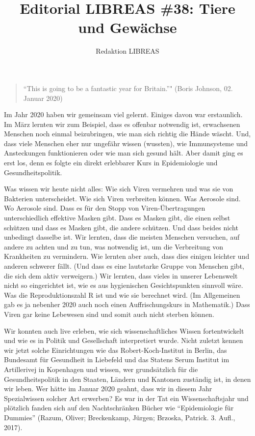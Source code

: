 \documentclass[a4paper,
fontsize=11pt,
oneside,
numbers=noperiodatend,
parskip=half-,
bibliography=totoc,
final
]{scrartcl}
\title{\LARGE{Editorial LIBREAS \#38: Tiere und Gewächse}}%
\author{Redaktion LIBREAS} %
\date{}
\begin{document}
\maketitle
\thispagestyle{fancyplain} 


\begin{quote}
\enquote{This is going to be a fantastic year for Britain.}" (Boris
Johnson, 02. Januar 2020)
\end{quote}

Im Jahr 2020 haben wir gemeinsam viel gelernt. Einiges davon war
erstaunlich. Im März lernten wir zum Beispiel, dass es offenbar
notwendig ist, erwachsenen Menschen noch einmal beizubringen, wie man
sich richtig die Hände wäscht. Und, dass viele Menschen eher nur
ungefähr wissen (wussten), wie Immunsysteme und Ansteckungen
funktionieren oder wie man sich gesund hält. Aber damit ging es erst
los, denn es folgte ein direkt erlebbarer Kurs in Epidemiologie und
Gesundheitspolitik.

Was wissen wir heute nicht alles: Wie sich Viren vermehren und was sie
von Bakterien unterscheidet. Wie sich Viren verbreiten können. Was
Aerosole sind. Wo Aerosole sind. Dass es für den Stopp von
Viren-Übertragungen unterschiedlich effektive Masken gibt. Dass es
Masken gibt, die einen selbst schützen und dass es Masken gibt, die
andere schützen. Und dass beides nicht unbedingt dasselbe ist. Wir
lernten, dass die meisten Menschen versuchen, auf andere zu achten und
zu tun, was notwendig ist, um die Verbreitung von Krankheiten zu
vermindern. Wie lernten aber auch, dass dies einigen leichter und
anderen schwerer fällt. (Und dass es eine lautstarke Gruppe von Menschen
gibt, die sich dem aktiv verweigern.) Wir lernten, dass vieles in
unserer Lebenswelt nicht so eingerichtet ist, wie es aus hygienischen
Gesichtspunkten sinnvoll wäre. Was die Reproduktionszahl R ist und wie
sie berechnet wird. (Im Allgemeinen gab es ja nebenher 2020 auch noch
einen Auffrischungskurs in Mathematik.) Dass Viren gar keine Lebewesen
sind und somit auch nicht sterben können.

Wir konnten auch live erleben, wie sich wissenschaftliches Wissen
fortentwickelt und wie es in Politik und Gesellschaft interpretiert
wurde. Nicht zuletzt kennen wir jetzt solche Einrichtungen wie das
Robert-Koch-Institut in Berlin, das Bundesamt für Gesundheit in
Liebefeld und das Statens Serum Institut im Artillerivej in Kopenhagen
und wissen, wer grundsätzlich für die Gesundheitspolitik in den Staaten,
Ländern und Kantonen zuständig ist, in denen wir leben. Wer hätte im
Januar 2020 geahnt, dass wir in diesem Jahr Spezialwissen solcher Art
erwerben? Es war in der Tat ein Wissenschaftsjahr und plötzlich fanden
sich auf den Nachtschränken Bücher wie \enquote{Epidemiologie für
Dummies} (Razum, Oliver; Breckenkamp, Jürgen; Brzoska, Patrick. 3.
Aufl., 2017).
\end{document}
